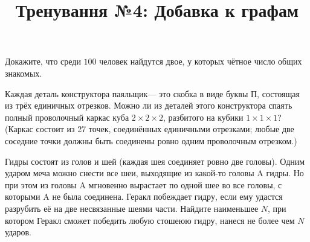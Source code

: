 


\title{Тренування №4: Добавка к графам}
\maketitle
\begin{problem}
	Докажите, что среди $100$ человек найдутся двое, у которых чётное число общих знакомых.
\end{problem}

\begin{problem}
	Каждая деталь конструктора  паяльщик\guillemotright --- это скобка в виде буквы П, состоящая из трёх единичных отрезков. Можно ли из деталей этого конструктора спаять полный проволочный каркас куба $2 \times 2 \times 2$, разбитого на кубики $1 \times 1 \times 1$? (Каркас состоит из 27 точек, соединённых единичными отрезками; любые две соседние точки должны быть соединены ровно одним проволочным отрезком.)
\end{problem}

\begin{problem}
	Гидры состоят из голов и шей (каждая шея соединяет ровно две головы). Одним ударом меча можно снести все шеи, выходящие из какой-то головы A гидры. Но при этом из головы A мгновенно вырастает по одной шее во все головы, с которыми A не была соединена. Геракл побеждает гидру, если ему удастся разрубить её на две несвязанные шеями части. Найдите наименьшее $N$, при котором Геракл сможет победить любую стошеюю гидру, нанеся не более чем $N$ ударов.
\end{problem}

